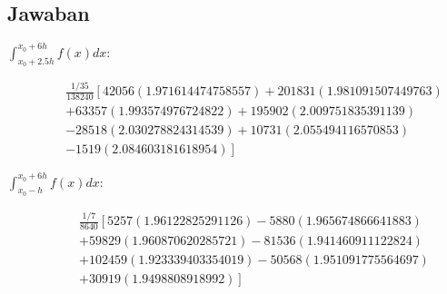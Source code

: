 \subsection{Jawaban}
\begin{description}
\item [{\textmd{$\int_{x_{0}+2.5h}^{x_{0}+6h}f(x)dx$:\label{ans:integralFormula1}}}] 
\[
\begin{gathered}\frac{1/35}{138240}\left[42056(1.971614474758557)+201831(1.981091507449763)\right.\\
+63357(1.993574976724822)+195902(2.009751835391139)\\
-28518(2.030278824314539)+10731(2.055494116570853)\\
\left.-1519(2.084603181618954)\right]
\end{gathered}
\]
 
\item [{$\int_{x_{0}-h}^{x_{0}+6h}f(x)dx$:\label{ans:integralFormula2}}] 
\[
\begin{gathered}\frac{1/7}{8640}\left[5257(1.96122825291126)-5880(1.965674866641883)\right.\\
+59829(1.960870620285721)-81536(1.941460911122824)\\
+102459(1.923339403354019)-50568(1.951091775564697)\\
\left.+30919(1.9498808918992)\right]
\end{gathered}
\]
\end{description}

